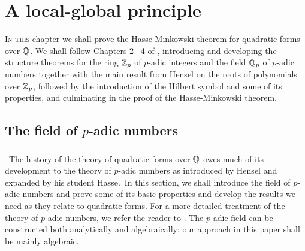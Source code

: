 \chapter{A local-global principle}
\label{chap:local-global-principle}

{\scshape In this} chapter we shall prove the Hasse-Minkowski theorem for
quadratic forms over \(\mathbb{Q}\). We shall follow Chapters 2\,--\,4 of
\cite{serre2012course}, introducing and developing the structure theorems for
the ring \(\mathbb{Z}_p\) of \(p\)-adic integers and the field \(\mathbb{Q}_p\)
of \(p\)-adic numbers together with the main result from Hensel on the roots of
polynomials over \(\mathbb{Z}_p\), followed by the introduction of the Hilbert
symbol and some of its properties, and culminating in the proof of the
Hasse-Minkowski theorem.

\section{The field of \(p\)-adic numbers}

\subsection{}~The history of the theory of quadratic forms over \(\mathbb{Q}\)
owes much of its development to the theory of \(p\)-adic numbers as introduced
by Hensel and expanded by his student
Hasse.\,\cite{hasse1922uber,hensel1913zahlentheorie} In this section, we shall
introduce the field of \(p\)-adic numbers and prove some of its basic properties
and develop the results we need as they relate to quadratic forms. For a more
detailed treatment of the theory of \(p\)-adic numbers, we refer the reader to
\cite{gouvea1997p,koblitzp}. The \(p\)-adic field can be constructed both
analytically and algebraically; our approach in this paper shall be mainly
algebraic.\label{sec:field-of-p-adic-numbers}


